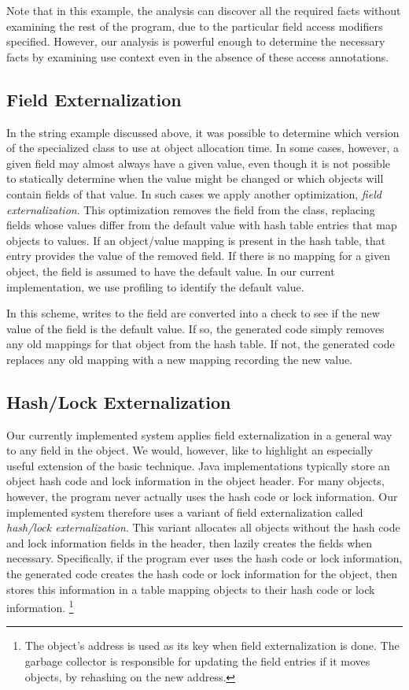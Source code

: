 \documentclass{sig-alt-full}
\begin{document}
Note that in this example, the analysis can discover all the required
facts without examining the rest of the program, due to the particular
field access modifiers specified.  However, our analysis is powerful
enough to determine the necessary facts by examining use context even
in the absence of these access annotations.

\subsection{Field Externalization}

In the string example discussed above, it was possible to determine
which version of the specialized class to use at object allocation
time. In some cases, however, a given field may almost always have
a given value, even though it is not possible to statically determine
when the value might be changed or which objects will contain fields of that 
value. In such cases we apply another optimization, 
{\em field externalization}. This optimization removes the field
from the class, replacing fields whose values differ from the default 
value with hash table entries that map objects to values. If an object/value
mapping is present in the hash table, that entry provides the 
value of the removed field. If there is no mapping for a given object,
the field is assumed to have the default value. 
In our current implementation, we use profiling 
to identify the default value. 

In this scheme, writes to the field are converted into a check to see
if the new value of the field is the default value. If so, the 
generated code simply removes any old mappings for that 
object from the hash table.
If not, the generated code replaces any old mapping with a new
mapping recording the new value. 

\subsection{Hash/Lock Externalization}

Our currently implemented system applies field externalization
in a general way to any field in the object. We would, however,
like to highlight an especially useful extension of the basic
technique. Java implementations typically store an object
hash code and lock information in the object header. For many
objects, however, the program never actually uses the hash code
or lock information. Our implemented system therefore uses
a variant of field externalization called {\em hash/lock 
externalization}. This variant allocates all objects 
without the hash code and lock information fields in the header,
then lazily creates the fields when necessary. 
Specifically, if the program ever uses the hash code or lock information, 
the generated code creates the hash code or lock information
for the object, then stores this information in a table
mapping objects to their hash code or lock information.%
\footnote{The object's address is used as its key when
  field externalization is done.  The garbage collector is responsible
  for updating the field entries if it moves objects, by rehashing on
  the new address.}
\end{document}
